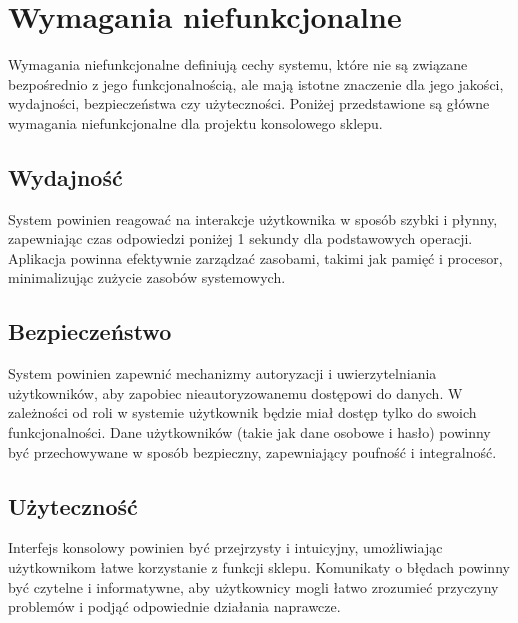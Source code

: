 \newpage
\section{Wymagania niefunkcjonalne}
Wymagania niefunkcjonalne definiują cechy systemu, które nie są związane bezpośrednio z jego funkcjonalnością, ale mają istotne znaczenie dla jego jakości, wydajności, bezpieczeństwa czy użyteczności. Poniżej przedstawione są główne wymagania niefunkcjonalne dla projektu konsolowego sklepu.

\subsection{Wydajność}
System powinien reagować na interakcje użytkownika w sposób szybki i płynny, zapewniając czas odpowiedzi poniżej 1 sekundy dla podstawowych operacji. Aplikacja powinna efektywnie zarządzać zasobami, takimi jak pamięć i procesor, minimalizując zużycie zasobów systemowych.

\subsection{Bezpieczeństwo}
System powinien zapewnić mechanizmy autoryzacji i uwierzytelniania użytkowników, aby zapobiec nieautoryzowanemu dostępowi do danych. W zależności od roli w systemie użytkownik będzie miał dostęp tylko do swoich funkcjonalności. Dane użytkowników (takie jak dane osobowe i hasło) powinny być przechowywane w sposób bezpieczny, zapewniający poufność i integralność.

\subsection{Użyteczność}
Interfejs konsolowy powinien być przejrzysty i intuicyjny, umożliwiając użytkownikom łatwe korzystanie z funkcji sklepu. Komunikaty o błędach powinny być czytelne i informatywne, aby użytkownicy mogli łatwo zrozumieć przyczyny problemów i podjąć odpowiednie działania naprawcze.